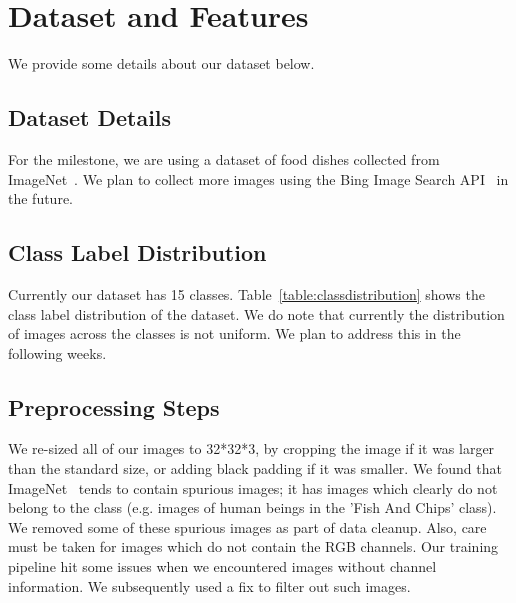 \section{Dataset and Features}

%

We provide some details about our dataset below.

\subsection{Dataset Details}
For the milestone, we are using a dataset of food dishes collected from ImageNet~\cite{imagenet}. We plan to collect more images using the Bing Image Search API~\cite{bingimagesearchapi} in the future.

\subsection{Class Label Distribution}
Currently our dataset has 15 classes. Table~\ref{table:classdistribution} shows the class label distribution of the dataset. We do note that currently the distribution of images across the classes is not uniform. We plan to address this in the following weeks.

\subsection{Preprocessing Steps}

We re-sized all of our images to 32*32*3, by cropping the image if it was larger than the standard size, or adding black padding if it was smaller. We found that ImageNet~\cite{imagenet} tends to contain spurious images; it has images which clearly do not belong to the class (e.g. images of human beings in the 'Fish And Chips' class). We removed some of these spurious images as part of data cleanup. Also, care must be taken for images which do not contain the RGB channels. Our training pipeline hit some issues when we encountered images without channel information. We subsequently used a fix to filter out such images. 

